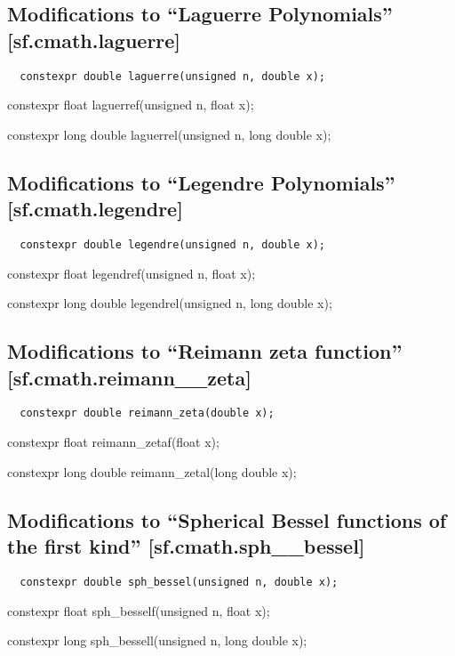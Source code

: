 \documentclass[prd,twocolumn,amsmath,amssymb,nofootinbib,eqsecnum]{revtex4-1}
\newcommand{\code}[1]{{\tt #1}}
\newcommand{\highlight}[1]{{\color{red} #1}}
\begin{document}
\subsection{Modifications to  ``Laguerre Polynomials''  [sf.cmath.laguerre]}

\code{
	\highlight{constexpr} double laguerre(unsigned n, double x);
	
	\highlight{constexpr} float laguerref(unsigned n, float x);
	
	\highlight{constexpr} long double laguerrel(unsigned n, long double x);

}

\subsection{Modifications to  ``Legendre Polynomials''  [sf.cmath.legendre]}

\code{
	\highlight{constexpr} double legendre(unsigned n, double x);
	
	\highlight{constexpr} float legendref(unsigned n, float x);
	
	\highlight{constexpr} long double legendrel(unsigned n, long double x);

}


\subsection{Modifications to  ``Reimann zeta function''  [sf.cmath.reimann\_\_zeta]}

\code{
	\highlight{constexpr} double reimann\_zeta(double x);
	
	\highlight{constexpr} float reimann\_zetaf(float x);
	
	\highlight{constexpr} long double reimann\_zetal(long double x);

}

\subsection{Modifications to  ``Spherical Bessel functions of the first kind''  [sf.cmath.sph\_\_bessel]}

\code{
	\highlight{constexpr} double sph\_bessel(unsigned n, double x);
	
	\highlight{constexpr} float sph\_besself(unsigned n, float x);
	
	\highlight{constexpr} long sph\_bessell(unsigned n, long double x);

}
\end{document}
